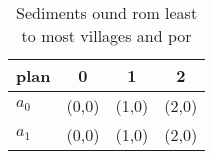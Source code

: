 \documentclass[a4paper]{article}
\begin{document}
\begin{table}
\begin{adjustbox}{width=0.6\columnwidth}
\begin{tabular}{|l|l|l|l|}
\hline
\textbf{plan} & \multicolumn{1}{c|}{\textbf{0}} & \multicolumn{1}{c|}{\textbf{1}} & \multicolumn{1}{c|}{\textbf{2}} \\ \hline
\textbf{$a_0$}  & (0,0) & (1,0) & (2,0) \\ \hline
\textbf{$a_1$}  & (0,0) & (1,0) & (2,0) \\ \hline
\end{tabular}
\end{adjustbox}
\caption{Sediments ound rom least to most villages and por
}
\end{table}
\end{document}
